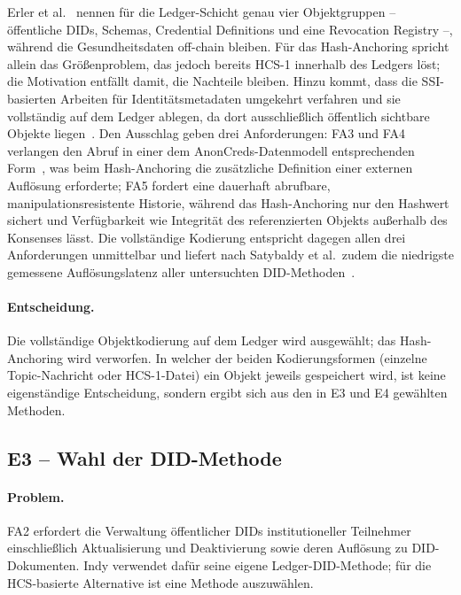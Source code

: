 Erler et al.~\cite{erler2023} nennen für die Ledger-Schicht genau vier Objektgruppen -- öffentliche DIDs, Schemas, Credential Definitions und eine Revocation Registry --, während die Gesundheitsdaten off-chain bleiben. Für das Hash-Anchoring spricht allein das Größenproblem, das jedoch bereits HCS-1 innerhalb des Ledgers löst; die Motivation entfällt damit, die Nachteile bleiben. Hinzu kommt, dass die SSI-basierten Arbeiten für Identitätsmetadaten umgekehrt verfahren und sie vollständig auf dem Ledger ablegen, da dort ausschließlich öffentlich sichtbare Objekte liegen~\cite{torongo2023,manoj2022}. Den Ausschlag geben drei Anforderungen: FA3 und FA4 verlangen den Abruf in einer dem AnonCreds-Datenmodell entsprechenden Form~\cite{anoncredsspec}, was beim Hash-Anchoring die zusätzliche Definition einer externen Auflösung erforderte; FA5 fordert eine dauerhaft abrufbare, manipulationsresistente Historie, während das Hash-Anchoring nur den Hashwert sichert und Verfügbarkeit wie Integrität des referenzierten Objekts außerhalb des Konsenses lässt. Die vollständige Kodierung entspricht dagegen allen drei Anforderungen unmittelbar und liefert nach Satybaldy et al.\ zudem die niedrigste gemessene Auflösungslatenz aller untersuchten DID-Methoden~\cite{satybaldy2026}.

\paragraph{Entscheidung.}
Die vollständige Objektkodierung auf dem Ledger wird ausgewählt; das Hash-Anchoring wird verworfen. In welcher der beiden Kodierungsformen (einzelne Topic-Nachricht oder HCS-1-Datei) ein Objekt jeweils gespeichert wird, ist keine eigenständige Entscheidung, sondern ergibt sich aus den in E3 und E4 gewählten Methoden.


\subsection{E3 -- Wahl der DID-Methode}
\label{subsec:e3-did-methode}

\paragraph{Problem.}
FA2 erfordert die Verwaltung öffentlicher DIDs institutioneller Teilnehmer einschließlich Aktualisierung und Deaktivierung sowie deren Auflösung zu DID-Dokumenten. Indy verwendet dafür seine eigene Ledger-DID-Methode; für die HCS-basierte Alternative ist eine Methode auszuwählen.


